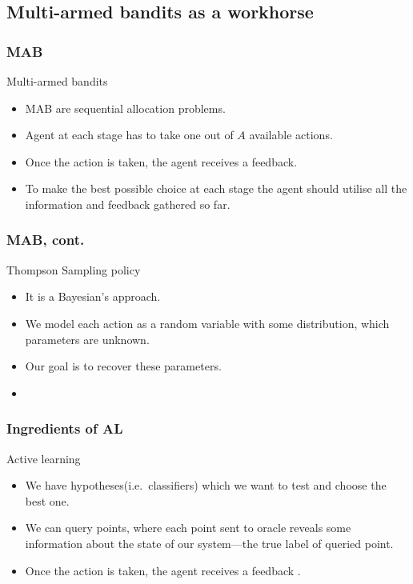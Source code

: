 \documentclass{beamer}
\begin{document}
\subsection{Multi-armed bandits as a workhorse}
  \begin{frame}
  \frametitle{MAB}
  \begin{block}{Multi-armed bandits}
    \begin{itemize}
      \item MAB are sequential allocation problems.
      \item Agent at each stage has to take one out of $A$ available actions.
      \item Once the action is taken, the agent receives a feedback.
      \item To make the best possible choice at each stage the agent should utilise all the information and feedback gathered so far.
    \end{itemize}
  \end{block}
  \end{frame}
  \begin{frame}
  \frametitle{MAB, cont.}
  \begin{block}{Thompson Sampling policy}
    \begin{itemize}
      \item It is a Bayesian's approach.
      \item We model each action as a random variable with some distribution, which parameters are unknown.
      \item Our goal is to recover these parameters.
      \item 
    \end{itemize}
  \end{block}
  \end{frame}

  \begin{frame}
  \frametitle{Ingredients of AL}
  \begin{block}{Active learning}
    \begin{itemize}
      \item We have hypotheses(i.e.\ classifiers) which we want to test and choose the best one.
      \item We can query points, where each point sent to oracle reveals some information about the state of our system---the true label of queried point.
      \item Once the action is taken, the agent receives a feedback .
    \end{itemize}
  \end{block}
  \end{frame}
\end{document}
